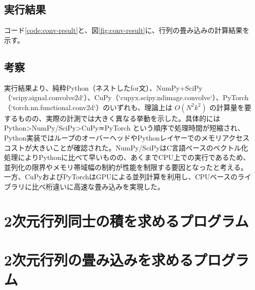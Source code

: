 \documentclass{ltjsarticle}
\begin{document}
\subsection{実行結果}
    コード\ref{code:conv-result}と、図\ref{fig:conv-result}に、行列の畳み込みの計算結果を示す。


\subsection{考察}
    実行結果より、純粋Python（ネストしたfor文）、NumPy+SciPy（`scipy.signal.convolve2d`）、CuPy（`cupyx.scipy.ndimage.convolve`）、PyTorch（`torch.nn.functional.conv2d`）のいずれも、理論上は \(O(N^2 k^2)\) の計算量を要するものの、実際の計測では大きく異なる挙動を示した。具体的にはPython>NumPy/SciPy>CuPy≃PyTorch
    という順序で処理時間が短縮され、Python実装ではループのオーバーヘッドやPythonレイヤーでのメモリアクセスコストが大きいことが確認された。NumPy/SciPyはC言語ベースのベクトル化処理によりPythonに比べて早いものの、あくまでCPU上での実行であるため、並列化の限界やメモリ帯域幅の制約が性能を制限する要因となったと考える。
    一方、CuPyおよびPyTorchはGPUによる並列計算を利用し、CPUベースのライブラリに比べ桁違いに高速な畳み込みを実現した。

\newpage
\appendix

\section{2次元行列同士の積を求めるプログラム}\label{appx:multiply}
\newpage

\section{2次元行列の畳み込みを求めるプログラム}\label{appx:conv}
\end{document}
